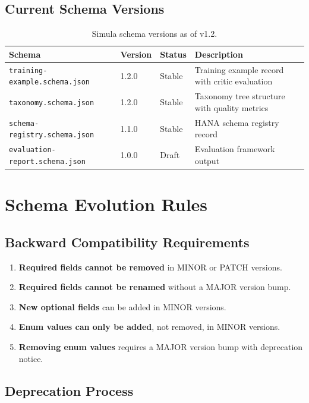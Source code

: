 \documentclass[12pt,a4paper,twoside]{report}
\begin{document}
\subsection{Current Schema Versions}

\begin{table}[htbp]
\centering
\caption{Simula schema versions as of v1.2.}
\label{tab:schema-versions}
\footnotesize
\begin{tabularx}{\textwidth}{@{}l l l X@{}}
\toprule
\textbf{Schema} & \textbf{Version} & \textbf{Status} & \textbf{Description} \\
\midrule
\texttt{training-example.schema.json} & 1.2.0 & Stable & Training example record with critic evaluation \\
\texttt{taxonomy.schema.json} & 1.2.0 & Stable & Taxonomy tree structure with quality metrics \\
\texttt{schema-registry.schema.json} & 1.1.0 & Stable & HANA schema registry record \\
\texttt{evaluation-report.schema.json} & 1.0.0 & Draft & Evaluation framework output \\
\bottomrule
\end{tabularx}
\end{table}

\section{Schema Evolution Rules}

\subsection{Backward Compatibility Requirements}

\begin{enumerate}
\item \textbf{Required fields cannot be removed} in MINOR or PATCH versions.
\item \textbf{Required fields cannot be renamed} without a MAJOR version bump.
\item \textbf{New optional fields} can be added in MINOR versions.
\item \textbf{Enum values can only be added}, not removed, in MINOR versions.
\item \textbf{Removing enum values} requires a MAJOR version bump with deprecation notice.
\end{enumerate}

\subsection{Deprecation Process}
\end{document}
